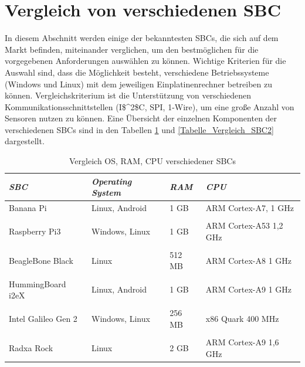 \section{Vergleich von verschiedenen SBC}
\label{section_Vergleich_SBC}
In diesem Abschnitt werden einige der bekanntesten \acp{SBC}, die sich auf dem Markt befinden, miteinander verglichen, um den bestmöglichen für die vorgegebenen Anforderungen auswählen zu können.
Wichtige Kriterien für die Auswahl sind, dass die Möglichkeit besteht, verschiedene Betriebssysteme (Windows und Linux) mit dem jeweiligen Einplatinenrechner betreiben zu können. Vergleichskriterium ist die Unterstützung von verschiedenen Kommunikationsschnittstellen (\ac{I$^2$C}, \ac{SPI}, 1-Wire), um eine große Anzahl von Sensoren nutzen zu können. Eine Übersicht der einzelnen Komponenten der verschiedenen \acp{SBC} sind in den Tabellen \ref{Tabelle_Vergleich_SBC1} und \ref{Tabelle_Vergleich_SBC2} dargestellt.

\begin{table}[H]
\centering
\begin{tabular}{
llll
}
\toprule
\multicolumn{1}{p{3cm}}{\textit{\ac{SBC}}} & \multicolumn{1}{p{3.5cm}}{\textit{Operating System} } & \multicolumn{1}{p{1,5cm}}{\textit{RAM} }&\multicolumn{1}{p{3cm}}{ \centering\textit{CPU} }\\\midrule
Banana Pi & Linux, Android & 1 GB & ARM Cortex-A7, 1 GHz\\
&&&\\
Raspberry Pi3&Windows, Linux&1 GB&ARM Cortex-A53 1,2 GHz\\
&&&\\
BeagleBone Black & Linux & 512 MB & ARM Cortex-A8 1 GHz\\
&&&\\
HummingBoard i2eX & Linux, Android & 1 GB & ARM Cortex-A9 1 GHz\\
&&&\\
Intel Galileo Gen 2 & Windows, Linux & 256 MB & x86 Quark 400 MHz\\
&&&\\
Radxa Rock & Linux & 2 GB & ARM Cortex-A9 1,6 GHz\\
\bottomrule
\end{tabular}
\caption{Vergleich OS, RAM, CPU verschiedener SBCs}
\label{Tabelle_Vergleich_SBC1}
\end{table}

